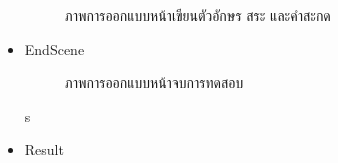 \documentclass[12pt,oneside,openright,a4paper]{cpe-thai-project}
\begin{document}
\begin{itemize}
\begin{figure}[!ht]
    \caption{ภาพการออกแบบหน้าเขียนตัวอักษร สระ และคำสะกด}\label{fig:system}
  \end{figure}
  \newpage
  \item EndScene
  \begin{figure}[!ht]\centering
    \setlength{\fboxrule}{0.2mm} %
    \setlength{\fboxsep}{1cm}
    \caption{ภาพการออกแบบหน้าจบการทดสอบ}\label{fig:system}
  \end{figure}s
  \item Result
    \begin{figure}[!ht]\centering
      \setlength{\fboxrule}{0.2mm} %
      \setlength{\fboxsep}{1cm}

\end{figure}
\end{itemize}
\end{document}
